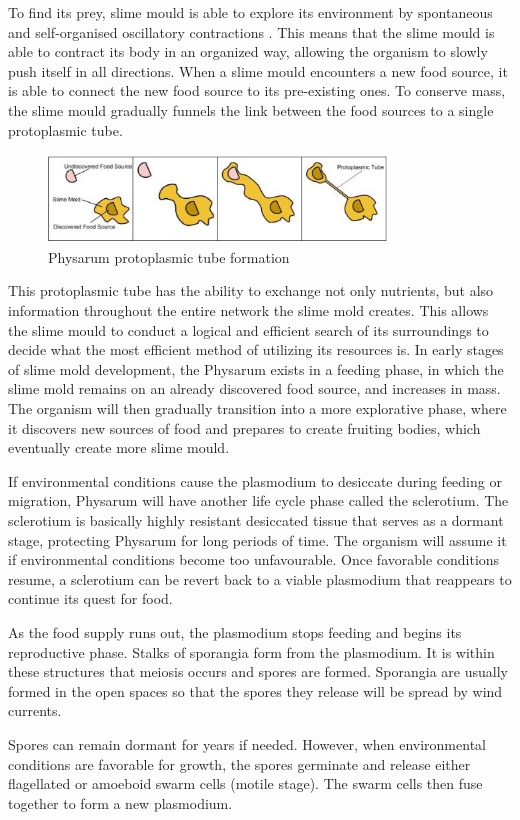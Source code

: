 \par
To find its prey, slime mould is able to explore its environment by spontaneous and self-organised oscillatory contractions \cite{jones2015exploiting}. This means that the slime mould is able to contract its body in an organized way, allowing the organism to slowly push itself in all directions. When a slime mould encounters a new food source, it is able to connect the new food source to its pre-existing ones. To conserve mass, the slime mould gradually funnels the link between the food sources to a single protoplasmic tube.
 
\begin{figure}
  \centering
    \includegraphics[width=0.8\textwidth]{phys_tubecreation}%
    
  \caption{Physarum protoplasmic tube formation}
  \label{fig:phys_tubecreation}
\end{figure}

\par
This protoplasmic tube has the ability to exchange not only nutrients, but also information throughout the entire network the slime mold creates. This allows the slime mould to conduct a logical and efficient search of its surroundings to decide what the most efficient method of utilizing its resources is.
In early stages of slime mold development, the Physarum exists in a feeding phase, in which the slime mold remains on an already discovered food source, and increases in mass. The organism will then gradually transition into a more explorative phase, where it discovers new sources of food and prepares to create fruiting bodies, which eventually create more slime mould.
\par
If environmental conditions cause the plasmodium to desiccate during feeding or migration, Physarum will have another life cycle phase called the sclerotium. The sclerotium is basically highly resistant desiccated tissue that serves as a dormant stage, protecting Physarum for long periods of time. The organism will assume it if environmental conditions become too
unfavourable. Once favorable conditions resume, a sclerotium can be revert back to a viable plasmodium that reappears to continue its quest for food.
\par
As the food supply runs out, the plasmodium stops feeding and begins its reproductive phase. Stalks of sporangia form from the plasmodium. It is within these structures that meiosis occurs and spores are formed. Sporangia are usually formed in the open spaces so that the spores they release will be spread by wind currents.
\par
Spores can remain dormant for years if needed. However, when environmental conditions are favorable for growth, the spores germinate and release either flagellated or amoeboid swarm cells (motile stage). The swarm cells then fuse together to form a new plasmodium. 

